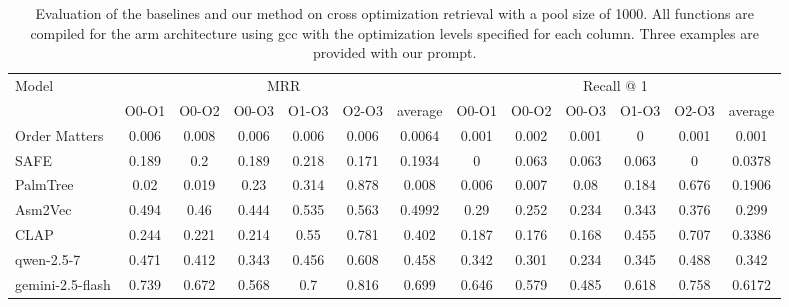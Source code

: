 \documentclass[conference,compsoc]{IEEEtran}
\begin{document}
{
    \renewcommand{\arraystretch}{1.3}

    \begin{table*}[!t]
    \centering
    \begin{tabular}{l|cccccc|cccccc}
    \hline
    \multirow{2}{*}{Model} & \multicolumn{6}{c|}{MRR}                        & \multicolumn{6}{c}{Recall @ 1}                  \\ \cline{2-13}
                           & O0-O1 & O0-O2 & O0-O3 & O1-O3 & O2-O3 & average & O0-O1 & O0-O2 & O0-O3 & O1-O3 & O2-O3 & average \\
    Order Matters          & 0.006 & 0.008 & 0.006 & 0.006 & 0.006 & 0.0064  & 0.001 & 0.002 & 0.001 & 0     & 0.001 & 0.001   \\
    SAFE                   & 0.189 & 0.2   & 0.189 & 0.218 & 0.171 & 0.1934  & 0     & 0.063 & 0.063 & 0.063 & 0     & 0.0378  \\
    PalmTree               & 0.02  & 0.019 & 0.23  & 0.314 & 0.878 & 0.008   & 0.006 & 0.007 & 0.08  & 0.184 & 0.676 & 0.1906  \\
    Asm2Vec                & 0.494 & 0.46  & 0.444 & 0.535 & 0.563 & 0.4992  & 0.29  & 0.252 & 0.234 & 0.343 & 0.376 & 0.299   \\
    CLAP                   & 0.244 & 0.221 & 0.214 & 0.55  & 0.781 & 0.402   & 0.187 & 0.176 & 0.168 & 0.455 & 0.707 & 0.3386  \\ \hline
    qwen-2.5-7             & 0.471 & 0.412 & 0.343 & 0.456 & 0.608 & 0.458   & 0.342 & 0.301 & 0.234 & 0.345 & 0.488 & 0.342   \\
    gemini-2.5-flash       & 0.739 & 0.672 & 0.568 & 0.7   & 0.816 & 0.699   & 0.646 & 0.579 & 0.485 & 0.618 & 0.758 & 0.6172  \\ \hline
    \end{tabular}
    \caption{Evaluation of the baselines and our method on cross optimization retrieval with a pool size of 1000.
    All functions are compiled for the arm architecture using gcc with the optimization levels specified for each column.
    Three examples are provided with our prompt.}
    \label{x-opt}
    \end{table*}
}
\end{document}

